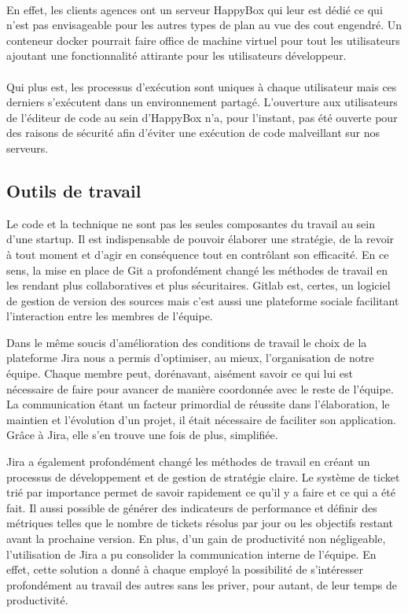 \documentclass[11pt, a4paper ]{article}
\begin{document}
\begin{spacing}{1.5}
 \paragraph{}
En effet, les clients agences ont un serveur HappyBox qui leur est dédié ce qui n'est pas envisageable pour les autres types de plan au vue des cout engendré. Un conteneur docker pourrait faire office de machine virtuel pour tout les utilisateurs ajoutant une fonctionnalité attirante pour les utilisateurs développeur.
\paragraph{}
Qui plus est, les processus d’exécution sont uniques à chaque utilisateur mais ces derniers s'exécutent dans un environnement partagé. L'ouverture aux utilisateurs de l'éditeur de code au sein d'HappyBox n'a, pour l'instant, pas été ouverte pour des raisons de sécurité afin d'éviter une exécution de code malveillant sur nos serveurs.


\subsection{Outils de travail}
Le code et la technique ne sont pas les seules composantes du travail au sein d'une startup. Il est indispensable de pouvoir élaborer une stratégie, de la revoir à tout moment et d'agir en conséquence tout en contrôlant son efficacité. En ce sens, la mise en place de Git a profondément changé les méthodes de travail en les rendant plus collaboratives et plus sécuritaires. Gitlab est, certes, un logiciel de gestion de version des sources mais c'est aussi une plateforme sociale facilitant l'interaction entre les membres de l'équipe.

Dans le même soucis d'amélioration des conditions de travail le choix de la plateforme Jira nous a permis d'optimiser, au mieux, l'organisation de notre équipe. Chaque membre peut, dorénavant, aisément savoir ce qui lui est nécessaire de faire pour avancer de manière coordonnée avec le reste de l'équipe. La communication étant un facteur primordial de réussite dans l'élaboration, le maintien et l'évolution d'un projet, il était nécessaire de faciliter son application. Grâce à Jira, elle s'en trouve une fois de plus, simplifiée.

Jira a également profondément changé les méthodes de travail en créant un processus de développement et de gestion de stratégie claire. Le système de ticket trié par importance permet de savoir rapidement ce qu'il y a faire et ce qui a été fait. Il aussi possible de générer des indicateurs de performance et définir des métriques telles que le nombre de tickets résolus par jour ou les objectifs restant avant la prochaine version.
En plus, d'un gain de productivité non négligeable, l'utilisation de Jira a pu consolider la communication interne de l'équipe. En effet, cette solution a donné à chaque employé la possibilité de s'intéresser profondément au travail des autres sans les priver, pour autant, de leur temps de productivité.


\end{spacing}
\end{document}
